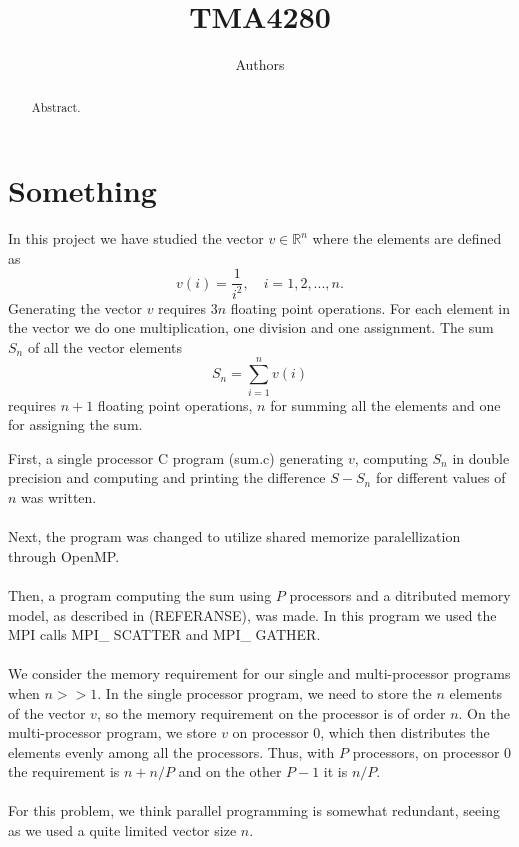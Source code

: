 \documentclass{article}
\title{TMA4280}
\author{Authors}
\begin{document}
\maketitle

\begin{abstract}
Abstract. 
\end{abstract}

\newpage
\section*{Something}
In this project we have studied the vector $v \in \mathbb{R}^n$ where the elements are defined as 
\begin{equation}
\label{vdefinition}
	v(i) =\frac{1}{i^2},\quad i = 1,2,...,n.
\end{equation}
Generating the vector $v$ requires $3n$ floating point operations. For each element in the vector we do one multiplication, one division and one assignment.  
The sum $S_n$ of all the vector elements 
\begin{equation}
\label{Sdefinition}
	S_n = \sum_{i=1}^n v(i)
\end{equation}
requires $n+1$ floating point operations, $n$ for summing all the elements and one for assigning the sum.

First, a single processor C program (sum.c) generating $v$, computing $S_n$ in double precision and computing and printing the difference $S - S_n$ for different values of $n$ was written. 
\\\\
Next, the program was changed to utilize shared memorize paralellization through OpenMP. 
\\\\
Then, a program computing the sum using $P	$ processors and a ditributed memory model, as described in (REFERANSE), was made. In this program we used the MPI calls MPI\_ SCATTER and MPI\_ GATHER. \\
\\
We consider the memory requirement for our single and multi-processor programs when $n >> 1$. In the single processor program, we need to store the $n$ elements of the vector $v$, so the memory requirement on the processor is of order $n$. On the multi-processor program, we store $v$ on processor $0$, which then distributes the elements evenly among all the processors. Thus, with $P$ processors, on processor $0$ the requirement is $n + n/P$ and on the other $P-1$ it is $n/P$. \\
\\
For this problem, we think parallel programming is somewhat redundant, seeing as we used a quite limited  vector size $n$.
\end{document}
